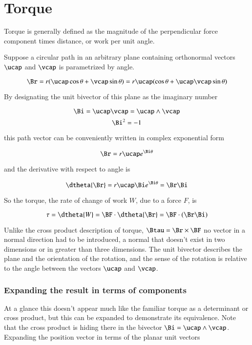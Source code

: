 \chapter{Torque}
\date{ Oct 13, 2007.  $RCSfile: gaWikiTorque.tex,v $ Last $Revision: 1.11 $ $Date: 2009/06/11 16:45:58 $ }

Torque is generally defined as the magnitude of the perpendicular force component times distance, or work per unit angle.

Suppose a circular path in an arbitrary plane containing orthonormal vectors $\ucap$ and $\vcap$ is parametrized by angle.

\[
\Br = r(\ucap \cos \theta + \vcap \sin \theta) = r \ucap(\cos \theta + \ucap \vcap \sin \theta)
\]

By designating the unit bivector of this plane as the imaginary number

\[
\Bi  = \ucap \vcap = \ucap \wedge \vcap
\]
\[
\Bi ^2 = -1
\]

this path vector can be conveniently written in complex exponential form

\[
\Br = r \ucap e^{\Bi \theta}
\]

and the derivative with respect to angle is

\[
\dtheta{\Br} = r \ucap \Bi  e^{\Bi  \theta} = \Br  \Bi 
\]

So the torque, the rate of change of work $W$, due to a force $F$, is

\[
\tau = \dtheta{W} = \BF \cdot \dtheta{\Br} = \BF \cdot (\Br  \Bi )
\]

Unlike the cross product description of torque, $\Btau = \Br \times \BF$ no vector in a normal direction had to be introduced, a normal that doesn't exist in two dimensions or in greater than three dimensions.  The unit bivector describes the plane and the orientation of the rotation, and the sense of the rotation is relative to the angle between the vectors $\ucap$ and $\vcap$.

\subsection{Expanding the result in terms of components }

At a glance this doesn't appear much like the familiar torque as a determinant or cross product, but this can be expanded to demonstrate its equivalence.  Note that the cross product is hiding there in the bivector $\Bi = \ucap \wedge \vcap$.  Expanding the position vector in terms of the planar unit vectors 

